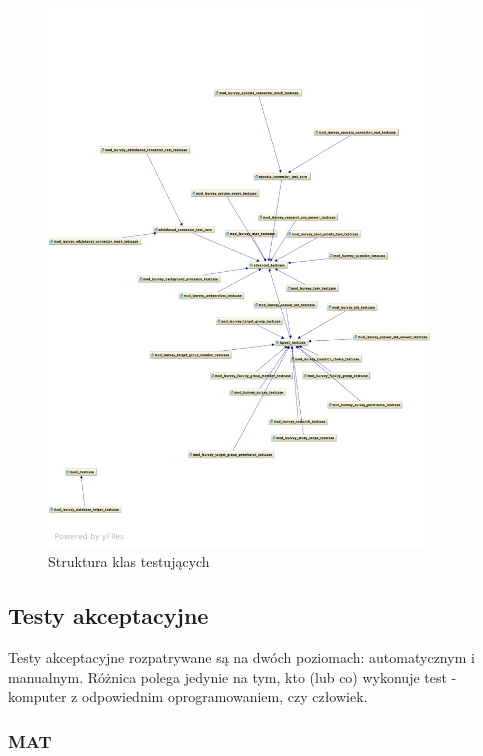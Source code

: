 \begin{figure}[H]
\begin{center}
\includegraphics[width=0.9\textwidth]{figures/lw/tests.pdf} 
\end{center}
\caption{Struktura klas testujących}
\label{fig:tests}
\end{figure}

\subsection{Testy akceptacyjne}
\label{Chapter713}

Testy akceptacyjne rozpatrywane są na dwóch poziomach: automatycznym i manualnym. Różnica polega jedynie na tym, kto (lub co) wykonuje test - komputer z odpowiednim oprogramowaniem, czy człowiek.

\subsubsection{MAT}
\label{Chapter7131}


